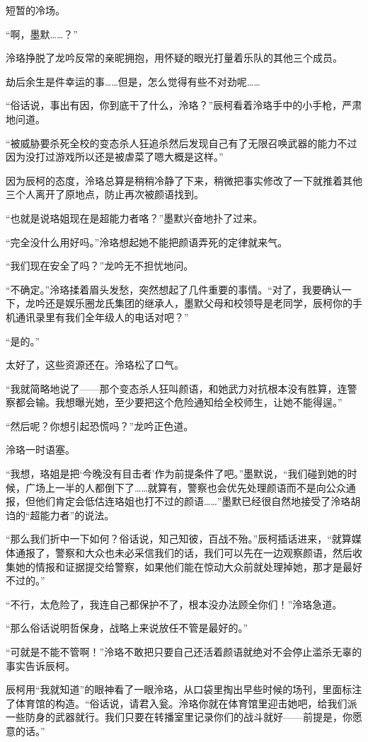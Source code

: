 \documentclass[UTF8, scheme = chinese, openany]{ctexbook}
\begin{document}
短暂的冷场。

“啊，墨默……？”

泠珞挣脱了龙吟反常的亲昵拥抱，用怀疑的眼光打量着乐队的其他三个成员。

劫后余生是件幸运的事……但是，怎么觉得有些不对劲呢……

“俗话说，事出有因，你到底干了什么，泠珞？”辰柯看着泠珞手中的小手枪，严肃地问道。

“被威胁要杀死全校的变态杀人狂追杀然后发现自己有了无限召唤武器的能力不过因为没打过游戏所以还是被虐菜了嗯大概是这样。”

因为辰柯的态度，泠珞总算是稍稍冷静了下来，稍微把事实修改了一下就推着其他三个人离开了原地点，防止再次被颜语找到。

“也就是说珞姐现在是超能力者咯？”墨默兴奋地扑了过来。

“完全没什么用好吗。”泠珞想起她不能把颜语弄死的定律就来气。

“我们现在安全了吗？”龙吟无不担忧地问。

“不确定。”泠珞揉着眉头发愁，突然想起了几件重要的事情。“对了，我要确认一下，龙吟还是娱乐圈龙氏集团的继承人，墨默父母和校领导是老同学，辰柯你的手机通讯录里有我们全年级人的电话对吧？”

“是的。”

太好了，这些资源还在。泠珞松了口气。

“我就简略地说了——那个变态杀人狂叫颜语，和她武力对抗根本没有胜算，连警察都会输。我想曝光她，至少要把这个危险通知给全校师生，让她不能得逞。”

“然后呢？你想引起恐慌吗？”龙吟正色道。

泠珞一时语塞。

“我想，珞姐是把‘今晚没有目击者’作为前提条件了吧。”墨默说，“我们碰到她的时候，广场上一半的人都倒下了……就算有，警察也会优先处理颜语而不是向公众通报，但他们肯定会低估连珞姐也打不过的颜语……”墨默已经很自然地接受了泠珞胡诌的“超能力者”的说法。

“那么我们折中一下如何？俗话说，知己知彼，百战不殆。”辰柯插话进来，“就算媒体通报了，警察和大众也未必采信我们的话，我们可以先在一边观察颜语，然后收集她的情报和证据提交给警察，如果他们能在惊动大众前就处理掉她，那才是最好不过的。”

“不行，太危险了，我连自己都保护不了，根本没办法顾全你们！”泠珞急道。

“那么俗话说明哲保身，战略上来说放任不管是最好的。”

“可就是不能不管啊！”泠珞不敢把只要自己还活着颜语就绝对不会停止滥杀无辜的事实告诉辰柯。

辰柯用“我就知道”的眼神看了一眼泠珞，从口袋里掏出早些时候的场刊，里面标注了体育馆的构造。“俗话说，请君入瓮。泠珞你就在体育馆里迎击她吧，给我们派一些防身的武器就行。我们只要在转播室里记录你们的战斗就好——前提是，你愿意的话。”
\end{document}
